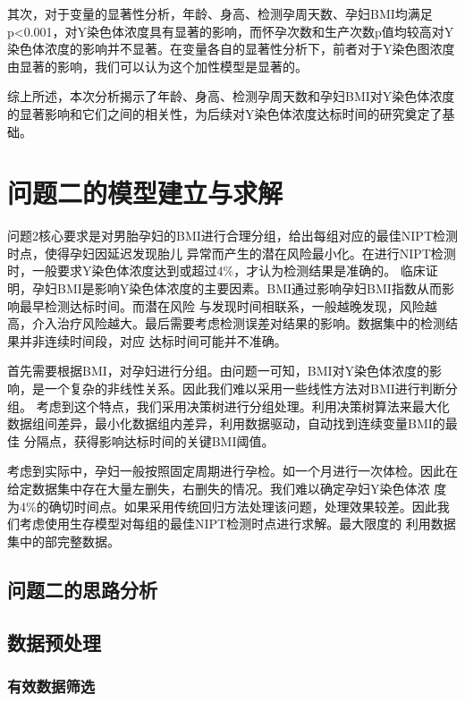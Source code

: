 \documentclass[withoutpreface,notoc]{cumcmthesis}
\begin{document}
	其次，对于变量的显著性分析，年龄、身高、检测孕周天数、孕妇BMI均满足p<0.001，对Y染色体浓度具有显著的影响，而怀孕次数和生产次数p值均较高对Y染色体浓度的影响并不显著。在变量各自的显著性分析下，前者对于Y染色图浓度由显著的影响，我们可以认为这个加性模型是显著的。

	综上所述，本次分析揭示了年龄、身高、检测孕周天数和孕妇BMI对Y染色体浓度的显著影响和它们之间的相关性，为后续对Y染色体浓度达标时间的研究奠定了基础。

	
	\section{问题二的模型建立与求解}

	问题2核心要求是对男胎孕妇的BMI进行合理分组，给出每组对应的最佳NIPT检测时点，使得孕妇因延迟发现胎儿
	异常而产生的潜在风险最小化。在进行NIPT检测时，一般要求Y染色体浓度达到或超过4\%，才认为检测结果是准确的。
	临床证明，孕妇BMI是影响Y染色体浓度的主要因素。BMI通过影响孕妇BMI指数从而影响最早检测达标时间。而潜在风险
	与发现时间相联系，一般越晚发现，风险越高，介入治疗风险越大。最后需要考虑检测误差对结果的影响。数据集中的检测结果并非连续时间段，对应
	达标时间可能并不准确。

	首先需要根据BMI，对孕妇进行分组。由问题一可知，BMI对Y染色体浓度的影响，是一个复杂的非线性关系。因此我们难以采用一些线性方法对BMI进行判断分组。
	考虑到这个特点，我们采用决策树进行分组处理。利用决策树算法来最大化数据组间差异，最小化数据组内差异，利用数据驱动，自动找到连续变量BMI的最佳
	分隔点，获得影响达标时间的关键BMI阈值。

	考虑到实际中，孕妇一般按照固定周期进行孕检。如一个月进行一次体检。因此在给定数据集中存在大量左删失，右删失的情况。我们难以确定孕妇Y染色体浓
	度为4\%的确切时间点。如果采用传统回归方法处理该问题，处理效果较差。因此我们考虑使用生存模型对每组的最佳NIPT检测时点进行求解。最大限度的
	利用数据集中的部完整数据。


	\subsection{问题二的思路分析}

	\subsection{数据预处理}

	\subsubsection{有效数据筛选}
\end{document}
